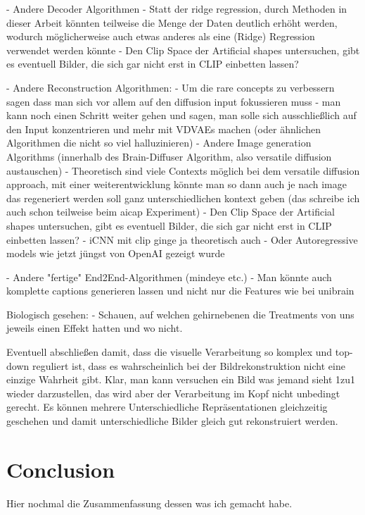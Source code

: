 - Andere Decoder Algorithmen 
    - Statt der ridge regression, durch Methoden in dieser Arbeit könnten teilweise die Menge der Daten deutlich erhöht werden, wodurch möglicherweise auch etwas anderes als eine (Ridge) Regression verwendet werden könnte
    - Den Clip Space der Artificial shapes untersuchen, gibt es eventuell Bilder, die sich gar nicht erst in CLIP einbetten lassen?

- Andere Reconstruction Algorithmen:
    - Um die rare concepts zu verbessern sagen \cite{samuelGeneratingImagesRare2024} dass man sich vor allem auf den diffusion input fokussieren muss
        - man kann noch einen Schritt weiter gehen und sagen, man solle sich ausschließlich auf den Input konzentrieren und mehr mit VDVAEs machen (oder ähnlichen Algorithmen die nicht so viel halluzinieren)
    - Andere Image generation Algorithms (innerhalb des Brain-Diffuser Algorithm, also versatile diffusion austauschen)
    - Theoretisch sind viele Contexts möglich bei dem versatile diffusion approach, mit einer weiterentwicklung könnte man so dann auch je nach image das regeneriert werden soll ganz unterschiedlichen kontext geben (das schreibe ich auch schon teilweise beim aicap Experiment)
    - Den Clip Space der Artificial shapes untersuchen, gibt es eventuell Bilder, die sich gar nicht erst in CLIP einbetten lassen?
    - iCNN mit clip ginge ja theoretisch auch
    - Oder Autoregressive models wie jetzt jüngst von OpenAI gezeigt wurde

- Andere "fertige" End2End-Algorithmen (mindeye etc.)
    - Man könnte auch komplette captions generieren lassen und nicht nur die Features wie bei unibrain \cite{maiUniBrainUnifyImage2023}

Biologisch gesehen:
    - Schauen, auf welchen gehirnebenen die Treatments von uns jeweils einen Effekt hatten und wo nicht.

    
Eventuell abschließen damit, dass die visuelle Verarbeitung so komplex und top-down reguliert ist, dass es wahrscheinlich bei der Bildrekonstruktion nicht eine einzige Wahrheit gibt. Klar, man kann versuchen ein Bild was jemand sieht 1zu1 wieder darzustellen, das wird aber der Verarbeitung im Kopf nicht unbedingt gerecht. Es können mehrere Unterschiedliche Repräsentationen gleichzeitig geschehen und damit unterschiedliche Bilder gleich gut rekonstruiert werden. 


\section{Conclusion}
Hier nochmal die Zusammenfassung dessen was ich gemacht habe. 


